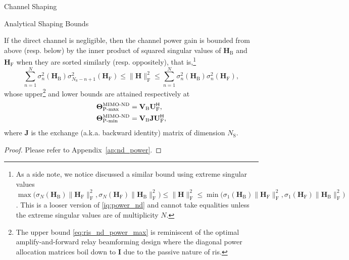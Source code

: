 \documentclass[journal]{IEEEtran}
\begin{document}
\begin{section}{Channel Shaping}
\begin{subsection}{Analytical Shaping Bounds}
		\begin{corollary}
			\label{co:nd_power}
			If the direct channel is negligible, then the channel power gain is bounded from above (resp. below) by the inner product of squared singular values of $\mathbf{H}_\mathrm{B}$ and $\mathbf{H}_\mathrm{F}$ when they are sorted similarly (resp. oppositely), that is,\footnote{As a side note, we notice \cite{Fang1994} discussed a similar bound using extreme singular values $\max\bigl(\sigma_{N}(\mathbf{H}_\mathrm{B}) \lVert \mathbf{H}_\mathrm{F} \rVert _\mathrm{F}^2, \sigma_{N}(\mathbf{H}_\mathrm{F}) \lVert \mathbf{H}_\mathrm{B} \rVert _\mathrm{F}^2\bigr) \le \lVert \mathbf{H} \rVert _\mathrm{F}^2 \le \min\bigl(\sigma_1(\mathbf{H}_\mathrm{B}) \lVert \mathbf{H}_\mathrm{F} \rVert _\mathrm{F}^2, \sigma_1(\mathbf{H}_\mathrm{F}) \lVert \mathbf{H}_\mathrm{B} \rVert _\mathrm{F}^2\bigr)$. This is a looser version of \eqref{iq:power_nd} and cannot take equalities unless the extreme singular values are of multiplicity $N$.}
			\begin{equation}
				\label{iq:power_nd}
				\sum_{n=1}^N \sigma_n^2(\mathbf{H}_\mathrm{B}) \sigma_{N_\mathrm{S}-n+1}^2(\mathbf{H}_\mathrm{F}) \le \lVert \mathbf{H} \rVert _\mathrm{F}^2 \le \sum_{n=1}^N \sigma_n^2(\mathbf{H}_\mathrm{B}) \sigma_n^2(\mathbf{H}_\mathrm{F}),
			\end{equation}
			whose upper\footnote{%
				\label{fn:power_nd_max}%
				The upper bound \eqref{eq:ris_nd_power_max} is reminiscent of the optimal amplify-and-forward relay beamforming design \cite[(16), (17)]{Rong2009a} where the diagonal power allocation matrices boil down to $\mathbf{I}$ due to the passive nature of \gls{ris}.} and lower bounds are attained respectively at
			\begin{subequations}
				\label{eq:ris_nd_power}
				\begin{align}
					\mathbf{\Theta}_\textnormal{P-max}^\textnormal{MIMO-ND} & = \mathbf{V}_\mathrm{B} \mathbf{U}_\mathrm{F}^\mathsf{H}, \label{eq:ris_nd_power_max}            \\
					\mathbf{\Theta}_\textnormal{P-min}^\textnormal{MIMO-ND} & = \mathbf{V}_\mathrm{B} \mathbf{J} \mathbf{U}_\mathrm{F}^\mathsf{H} \label{eq:ris_nd_power_min},
				\end{align}
			\end{subequations}
			where $\mathbf{J}$ is the exchange (a.k.a. backward identity) matrix of dimension $N_\mathrm{S}$.
		\end{corollary}
		\begin{proof}
			Please refer to Appendix~\ref{ap:nd_power}.
		\end{proof}


\end{subsection}
\end{section}
\end{document}

